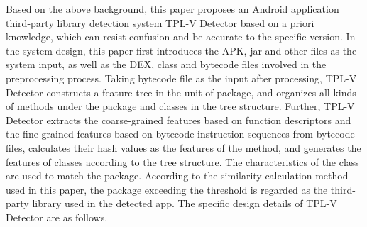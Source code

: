 \begin{digest}
Based on the above background, this paper proposes an Android application third-party library detection system TPL-V Detector based on a priori knowledge, which can resist confusion and be accurate to the specific version. In the system design, this paper first introduces the APK, jar and other files as the system input, as well as the DEX, class and bytecode files involved in the preprocessing process. Taking bytecode file as the input after processing, TPL-V Detector constructs a feature tree in the unit of package, and organizes all kinds of methods under the package and classes in the tree structure. Further, TPL-V Detector extracts the coarse-grained features based on function descriptors and the fine-grained features based on bytecode instruction sequences from bytecode files, calculates their hash values as the features of the method, and generates the features of classes according to the tree structure. The characteristics of the class are used to match the package. According to the similarity calculation method used in this paper, the package exceeding the threshold is regarded as the third-party library used in the detected app. The specific design details of TPL-V Detector are as follows.




\end{digest}
